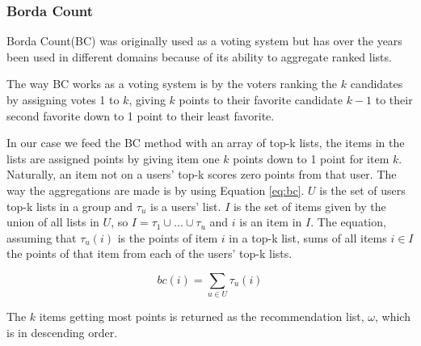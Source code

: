 \subsubsection{Borda Count}\label{sec:bordacount}
Borda Count(BC) was originally used as a voting system but has over the years been used in different domains because of its ability to aggregate ranked lists\cite{Baltrunas:2010:GRR:1864708.1864733, Masthoff2004}.

The way BC works as a voting system is by the voters ranking the $k$ candidates by assigning votes 1 to $k$, giving $k$ points to their favorite candidate $k-1$ to their second favorite down to 1 point to their least favorite.

In our case we feed the BC method with an array of top-k lists, the items in the lists are assigned points by giving item one $k$ points down to 1 point for item $k$\cite{ourreport}.  Naturally, an item not on a users' top-k scores zero points from that user. The way the aggregations are made is by using Equation \ref{eq:bc}. $U$ is the set of users top-k lists in a group and $\tau_u$ is a users' list. $I$ is the set of items given by the union of all lists in $U$, so $I = \tau_1 \cup ... \cup \tau_u$ and $i$ is an item in $I$. The equation, assuming that $\tau_u(i)$ is the points of item $i$ in a top-k list, sums of all items $i\in I$ the points of that item from each of the users' top-k lists.


\begin{equation}\label{eq:bc}
bc(i) = \sum_{u\in U} \tau_u(i)
\end{equation}

The $k$ items getting most points is returned as the recommendation list, $\omega$, which is in descending order.